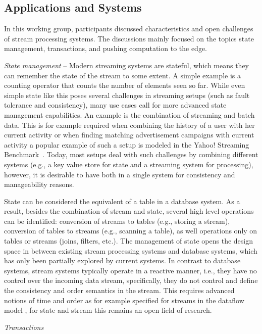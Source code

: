\subsection{Applications and Systems}

In this working group, participants discussed characteristics and open 
challenges of stream processing systems. The discussions mainly focused on 
the topics state management, transactions, and pushing computation to the edge.

\emph{State management} -- Modern streaming systems are stateful, which means they can remember the state 
of the stream to some extent. A simple example is a counting operator that 
counts the number of elements seen so far. While even simple state like this 
poses several challenges in streaming setups (such as fault tolerance and 
consistency), many use cases call for more advanced state management 
capabilities. An example is the combination of streaming and batch data. This
is for example required when combining the history of a user with her current
activity or when finding matching advertisement campaigns with current activity
a popular example of such a setup is modeled in the Yahoo! Streaming 
Benchmark~\cite{Chintapalli2016BenchmarkingSC}. Today, most setups deal with
such challenges by combining different systems (e.g., a key value store for
state and a streaming system for processing), however, it is desirable to have 
both in a single system for consistency and manageability reasons. 

State can be considered the equivalent of a table in a database system. As a 
result, besides the combination of stream and state, several high level
operations can be identified: conversion of streams to tables (e.g., storing 
a stream), conversion of tables to streams (e.g., scanning a table), as well 
operations only on tables or streams (joins, filters, etc.). The management of 
state opens the design space in between existing stream processing systems and 
database systems, which has only been partially explored by current systems.
In contrast to database systems, stream systems typically operate in a reactive
manner, i.e., they have no control over the incoming data stream, specifically, 
they do not control and define the consistency and order semantics in the 
stream. This requires advanced notions of time and order as for example 
specified for streams in the dataflow model \cite{43864}, for state and stream
this remains an open field of research. 


\emph{Transactions}


